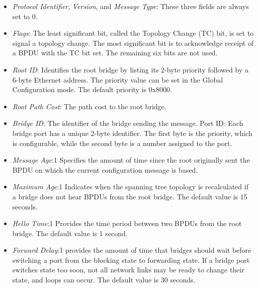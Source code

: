 \documentclass{UTNetLab}
\begin{document}
\begin{itemize}
	\item \textit{Protocol Identifier}, \textit{Version}, and \textit{Message Type}:
	These three fields are always set to 0.
	
	\item \textit{Flags}: The least significant bit, called the Topology Change (TC) bit, is set to signal a topology change.
	The most significant bit is to acknowledge receipt of a BPDU with the TC bit set.
	The remaining six bits are not used.
	
	\item \textit{Root ID}: Identifies the root bridge by listing its 2-byte priority followed by a 6-byte Ethernet address.
	The priority value can be set in the Global Configuration mode.
	The default priority is 0x8000.
	
	\item \textit{Root Path Cost}: The path cost to the root bridge.
	
	\item \textit{Bridge ID}: The identifier of the bridge sending the message.
	Port ID: Each bridge port has a unique 2-byte identifier.
	The first byte is the priority, which is configurable, while the second byte is a number assigned to the port.
	
	\item \textit{Message Age}:1 Specifies the amount of time since the root originally sent the BPDU on which the current configuration message is based.
	
	\item \textit{Maximum Age}:1 Indicates when the spanning tree topology is recalculated if a bridge does not hear BPDUs from the root bridge.
	The default value is 15 seconds.
	
	\item \textit{Hello Time}:1 Provides the time period between two BPDUs from the root bridge.
	The default value is 1 second.
	
	\item \textit{Forward Delay}:1 provides the amount of time that bridges should wait before switching a port from the blocking state to forwarding state.
	If a bridge port switches state too soon, not all network links may be ready to change their state, and loops can occur.
	The default value is 30 seconds.
\end{itemize}
\end{document}
